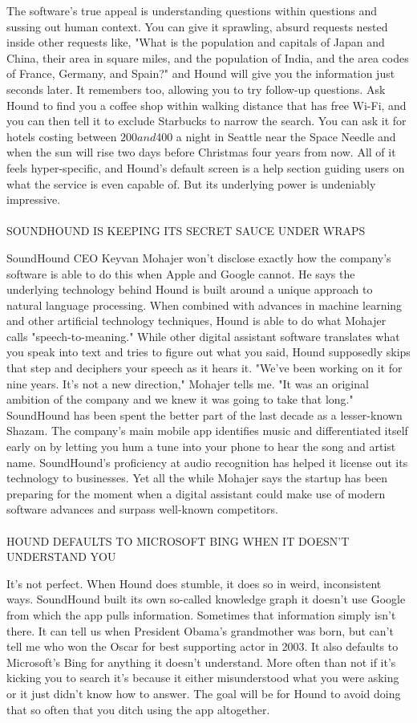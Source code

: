 \documentclass[12pt,a4paper]{article}
\begin{document}
The software's true appeal is understanding questions within questions and sussing out human context. You can give it sprawling, absurd requests nested inside other requests like, "What is the population and capitals of Japan and China, their area in square miles, and the population of India, and the area codes of France, Germany, and Spain?" and Hound will give you the information just seconds later.
It remembers too, allowing you to try follow-up questions. Ask Hound to find you a coffee shop within walking distance that has free Wi-Fi, and you can then tell it to exclude Starbucks to narrow the search. You can ask it for hotels costing between $200 and $400 a night in Seattle near the Space Needle and when the sun will rise two days before Christmas four years from now. All of it feels hyper-specific, and Hound's default screen is a help section guiding users on what the service is even capable of. But its underlying power is undeniably impressive.
\\\\ SOUNDHOUND IS KEEPING ITS SECRET SAUCE UNDER WRAPS
\par SoundHound CEO Keyvan Mohajer won't disclose exactly how the company's software is able to do this when Apple and Google cannot. He says the underlying technology behind Hound is built around a unique approach to natural language processing. When combined with advances in machine learning and other artificial technology techniques, Hound is able to do what Mohajer calls "speech-to-meaning." While other digital assistant software translates what you speak into text and tries to figure out what you said, Hound supposedly skips that step and deciphers your speech as it hears it.
"We’ve been working on it for nine years. It’s not a new direction," Mohajer tells me. "It was an original ambition of the company and we knew it was going to take that long." SoundHound has been spent the better part of the last decade as a lesser-known Shazam. The company's main mobile app identifies music and differentiated itself early on by letting you hum a tune into your phone to hear the song and artist name. SoundHound's proficiency at audio recognition has helped it license out its technology to businesses. Yet all the while Mohajer says the startup has been preparing for the moment when a digital assistant could make use of modern software advances and surpass well-known competitors.
\\\\ HOUND DEFAULTS TO MICROSOFT BING WHEN IT DOESN'T UNDERSTAND YOU
\par It's not perfect. When Hound does stumble, it does so in weird, inconsistent ways. SoundHound built its own so-called knowledge graph it doesn't use Google from which the app pulls information. Sometimes that information simply isn't there. It can tell us when President Obama's grandmother was born, but can't tell me who won the Oscar for best supporting actor in 2003. It also defaults to Microsoft's Bing for anything it doesn't understand. More often than not if it's kicking you to search it's because it either misunderstood what you were asking or it just didn't know how to answer. The goal will be for Hound to avoid doing that so often that you ditch using the app altogether.
\end{document}
